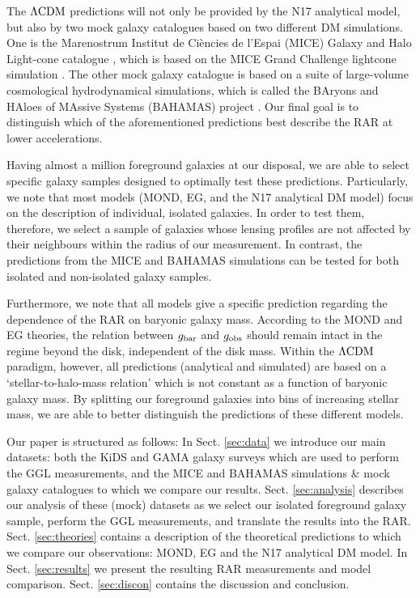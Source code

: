 \documentclass[usenatbib]{mnras}
\newcommand{\lcdm}{{\rm \Lambda CDM}}
\newcommand{\un}[1]{_{\rm #1}}
\begin{document}
The $\lcdm$ predictions will not only be provided by the N17 analytical model, but also by two mock galaxy catalogues based on two different DM simulations. One is the Marenostrum Institut de Ci{\`e}ncies de l'Espai (MICE) Galaxy and Halo Light-cone catalogue \cite[]{carretero2015,hoffmann2015}, which is based on the MICE Grand Challenge lightcone simulation \cite[MICE-GC,][]{fosalba2015a,fosalba2015b,crocce2015}. The other mock galaxy catalogue is based on a suite of large-volume cosmological hydrodynamical simulations, which is called the BAryons and HAloes of MAssive Systems (BAHAMAS) project \cite[]{mccarthy2017}. Our final goal is to distinguish which of the aforementioned predictions best describe the RAR at lower accelerations.

Having almost a million foreground galaxies at our disposal, we are able to select specific galaxy samples designed to optimally test these predictions. Particularly, we note that most models (MOND, EG, and the N17 analytical DM model) focus on the description of individual, isolated galaxies. In order to test them, therefore, we select a sample of galaxies whose lensing profiles are not affected by their neighbours within the radius of our measurement. In contrast, the predictions from the MICE and BAHAMAS simulations can be tested for both isolated and non-isolated galaxy samples.

Furthermore, we note that all models give a specific prediction regarding the dependence of the RAR on baryonic galaxy mass. According to the MOND and EG theories, the relation between $g\un{bar}$ and $g\un{obs}$ should remain intact in the regime beyond the disk, independent of the disk mass. Within the $\lcdm$ paradigm, however, all predictions (analytical and simulated) are based on a `stellar-to-halo-mass relation' which is not constant as a function of baryonic galaxy mass. By splitting our foreground galaxies into bins of increasing stellar mass, we are able to better distinguish the predictions of these different models.

Our paper is structured as follows: In Sect. \ref{sec:data} we introduce our main datasets: both the KiDS and GAMA galaxy surveys which are used to perform the GGL measurements, and the MICE and BAHAMAS simulations \& mock galaxy catalogues to which we compare our results. Sect. \ref{sec:analysis} describes our analysis of these (mock) datasets as we select our isolated foreground galaxy sample, perform the GGL measurements, and translate the results into the RAR. Sect. \ref{sec:theories} contains a description of the theoretical predictions to which we compare our observations: MOND, EG and the N17 analytical DM model. In Sect. \ref{sec:results} we present the resulting RAR measurements and model comparison. Sect. \ref{sec:discon} contains the discussion and conclusion.
\end{document}
